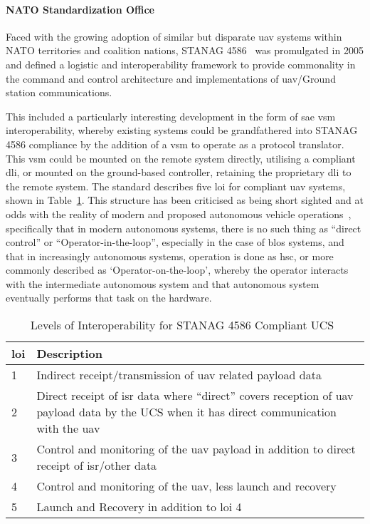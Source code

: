 \paragraph{NATO Standardization Office}
Faced with the growing adoption of similar but disparate \gls{uav} systems within NATO territories and coalition nations, STANAG 4586~\cite{STANAG4586} was promulgated in 2005 and defined a logistic and interoperability framework to provide commonality in the command and control architecture and implementations of \gls{uav}/Ground station communications.

This included a particularly interesting development in the form of \gls{sae} \gls{vsm} interoperability, whereby existing systems could be grandfathered into STANAG 4586 compliance by the addition of a \gls{vsm} to operate as a protocol translator.
This \gls{vsm} could be mounted on the remote system directly, utilising a compliant \gls{dli}, or mounted on the ground-based controller, retaining the proprietary \gls{dli} to the remote system.
The standard describes five \acrfull{loi} for compliant \gls{uav} systems, shown in Table~\ref{tab:levels_of_interoperability}.
This structure has been criticised as being short sighted and at odds with the reality of modern and proposed autonomous vehicle operations~\cite{Cummings2010}, specifically that in modern autonomous systems, there is no such thing as ``direct control'' or ``Operator-in-the-loop'', especially in the case of \gls{blos} systems, and that in increasingly autonomous systems, operation is done as \gls{hsc}, or more commonly described as ‘Operator-on-the-loop’, whereby the operator interacts with the intermediate autonomous system and that autonomous system eventually performs that task on the hardware.

\begin{table}
  \begin{tabularx}{\textwidth}{lX}
    \toprule
    \gls{loi} &  Description\\ \midrule
    1 &  Indirect receipt/transmission of \gls{uav} related payload data\\ 
    2 &  Direct receipt of \gls{isr} data where “direct” covers reception of \gls{uav} payload data by the UCS when it has direct communication with the \gls{uav}\\ 
    3 &  Control and monitoring of the \gls{uav} payload in addition to direct receipt of \gls{isr}/other data\\ 
    4 &  Control and monitoring of the \gls{uav}, less launch and recovery\\
    5 &  Launch and Recovery in addition to \gls{loi} 4\\ 
    \bottomrule 
  \end{tabularx}
  \caption[\gls{loi} for STANAG 4586 Compliant UCS]{Levels of Interoperability for STANAG 4586 Compliant UCS~\cite{STANAG4586}}
  \label{tab:levels_of_interoperability}
\end{table}

